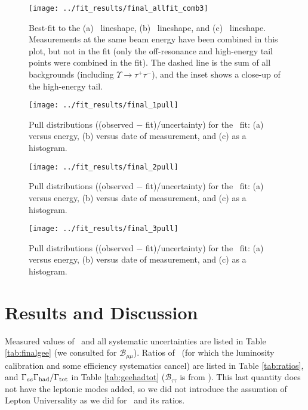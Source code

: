 \documentclass[aps,prd,preprint,superscriptaddress,tightenlines,nofootinbib,floatfix]{revtex4}
\begin{document}
\begin{figure}[p]
  \texttt{[image: ../fit\_results/final\_allfit\_comb3]}
  \caption{\label{fig:fits} Best-fit to the (a) \uone\ lineshape, (b)
    \utwo\ lineshape, and (c) \uthree\ lineshape.  Measurements at the
    same beam energy have been combined in this plot, but not in the
    fit (only the off-resonance and high-energy tail points were
    combined in the fit).  The dashed line is the sum of all
    backgrounds (including $\Upsilon \to \tau^+\tau^-$), and the inset
    shows a close-up of the high-energy tail.}
\end{figure}

\begin{figure}[p]
  \texttt{[image: ../fit\_results/final\_1pull]}
  \caption{\label{fig:pull1} Pull distributions ((observed $-$
    fit)/uncertainty) for the \uone\ fit: (a) versus energy, (b)
    versus date of measurement, and (c) as a histogram.}
\end{figure}

\begin{figure}[p]
  \texttt{[image: ../fit\_results/final\_2pull]}
  \caption{\label{fig:pull2} Pull distributions ((observed $-$
    fit)/uncertainty) for the \utwo\ fit: (a) versus energy, (b)
    versus date of measurement, and (c) as a histogram.}
\end{figure}

\begin{figure}[p]
  \texttt{[image: ../fit\_results/final\_3pull]}
  \caption{\label{fig:pull3} Pull distributions ((observed $-$
    fit)/uncertainty) for the \uthree\ fit: (a) versus energy, (b)
    versus date of measurement, and (c) as a histogram.}
\end{figure}

%
\section{Results and Discussion}
%

Measured values of \gee\ and all systematic uncertainties are listed
in Table \ref{tab:finalgee} (we consulted \cite{istvan} for
$\mathcal{B}_{\mu\mu}$).  Ratios of \gee\ (for which the luminosity
calibration and some efficiency systematics cancel) are listed in
Table \ref{tab:ratios}, and
$\Gamma_{ee}\Gamma_{\mbox{\scriptsize had}}/\Gamma_{\mbox{\scriptsize tot}}$ in Table
\ref{tab:geehadtot} ($\mathcal{B}_{\tau\tau}$ is from \cite{jean}).
This last quantity does not have the leptonic modes added, so we did
not introduce the assumtion of Lepton Universality as we did for \gee\
and its ratios.
\end{document}
